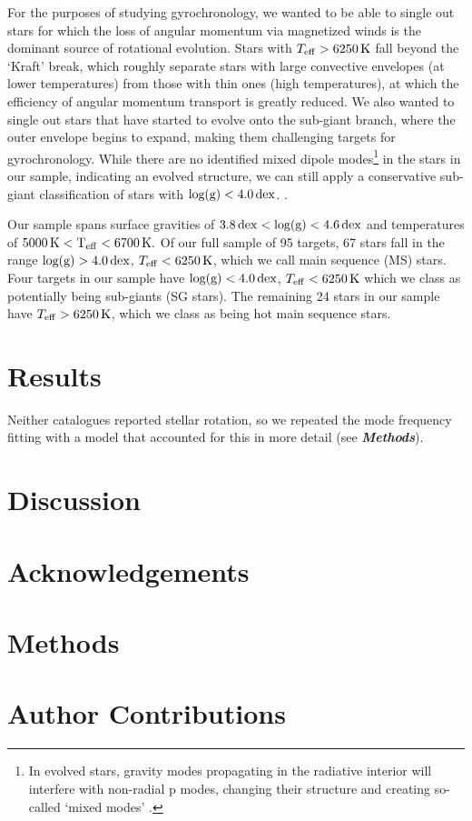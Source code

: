 \documentclass[12pt]{article}
\begin{document}
For the purposes of studying gyrochronology, we wanted to be able to single out stars for which the loss of angular momentum via magnetized winds is the dominant source of rotational evolution. Stars with $T_{\rm eff} > 6250\, \rm{K}$ fall beyond the `Kraft' break, which roughly separate stars with large convective envelopes (at lower temperatures) from those with thin ones (high temperatures), at which the efficiency of angular momentum transport is greatly reduced.  We also wanted to single out stars that have started to evolve onto the sub-giant branch, where the outer envelope begins to expand, making them challenging targets for gyrochronology. While there are no identified mixed dipole modes\footnote{In evolved stars, gravity modes propagating in the radiative interior will interfere with non-radial p modes, changing their structure and creating so-called `mixed modes' \cite{bedding+2010}.} in the stars in our sample, indicating an evolved structure, we can still apply a conservative sub-giant classification of stars with $\rm{log(g)} < 4.0\, \rm dex$. \cite{garcia+2014}.

Our sample spans surface gravities of $3.8\, \rm{dex} < \rm{log(g)} < 4.6\, \rm{dex}$ and temperatures of $5000\, \rm{K} < T_{\rm eff} <  6700\, \rm{K}.$ Of our full sample of 95 targets, 67 stars fall in the range $\rm{log(g)} > 4.0\, \rm dex$, $T_{\rm eff} < 6250\, \rm K$, which we call main sequence (MS) stars. Four targets in our sample have $\rm{log(g)} < 4.0\, \rm dex$, $T_{\rm eff} < 6250\, \rm K$ which we class as potentially being sub-giants (SG stars). The remaining 24 stars in our sample have $T_{\rm eff} > 6250\, \rm K$, which we class as being hot main sequence stars.


\section{Results}
 Neither catalogues reported stellar rotation, so we repeated the mode frequency fitting with a model that accounted for this in more detail (see \textbf{\textit{Methods}}).

\section{Discussion}



\section*{Acknowledgements}

\section*{Methods}

\section*{Author Contributions}
\end{document}
